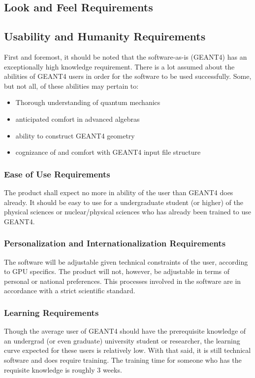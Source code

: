 \documentclass[12pt]{article}
\begin{document}
\subsection{Look and Feel Requirements} %

\subsection{Usability and Humanity Requirements} %
First and foremost, it should be noted that the software-as-is (GEANT4) has an exceptionally high knowledge requirement. There is a lot assumed about the abilities of GEANT4 users in order for the software to be used successfully. Some, but not all, of these abilities may pertain to:\\
\begin{itemize}
\item Thorough understanding of quantum mechanics
\item anticipated comfort in advanced algebras
\item ability to construct GEANT4 geometry
\item cognizance of and comfort with GEANT4 input file structure
\end{itemize}

\subsubsection{Ease of Use Requirements}
The product shall expect no more in ability of the user than GEANT4 does already. It should be easy to use for a 
undergraduate student (or higher) of the physical sciences or nuclear/physical sciences who has already been trained 
to use GEANT4.\\

\subsubsection{Personalization and Internationalization Requirements}
The software will be adjustable given technical constraints of the user, according to GPU specifics. The product will not, however, 
be adjustable in terms of personal or national preferences. This processes involved in the software are in accordance with a strict 
scientific standard. 

\subsubsection{Learning Requirements}
Though the average user of GEANT4 should have the prerequisite knowledge of an undergrad (or even graduate) university student or researcher, the learning curve expected for these users is relatively low. With that said, it is still technical software and does require training. The training time for someone who has the requisite knowledge is roughly 3 weeks.
\end{document}
